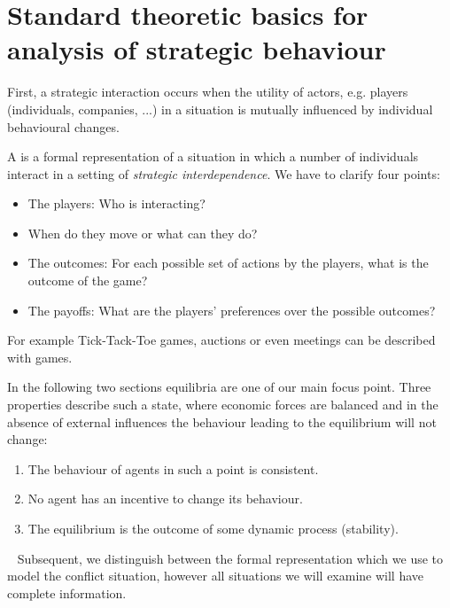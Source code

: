 

\chapter{Standard theoretic basics for analysis of strategic behaviour}

First, a strategic interaction occurs when the utility of actors, e.g. players (individuals, companies, ...) in a situation is mutually influenced by individual behavioural changes. 

A  is a formal representation of a situation in which a number of individuals interact in a setting of \textit{strategic interdependence}.
	We have to clarify four points:
	\begin{itemize}
		\item The players: Who is interacting?
		\item When do they move or what can they do?
		\item The outcomes: For each possible set of actions by the players, what is the outcome of the game?
		\item The payoffs: What are the players' preferences over the possible outcomes?
	\end{itemize}

For example Tick-Tack-Toe games, auctions or even meetings can be described with games. 

In the following two sections equilibria are one of our main focus point. Three properties describe such a state, where economic forces are balanced and in the absence of external influences the behaviour leading to the equilibrium will not change:
\begin{enumerate}
	\item The behaviour of agents in such a point is consistent.
	\item No agent has an incentive to change its behaviour.
	\item The equilibrium is the outcome of some dynamic process (stability).
\end{enumerate}

~\newline
Subsequent, we distinguish between the formal representation which we use to model the conflict situation, however all situations we will examine will have complete information.

\newpage